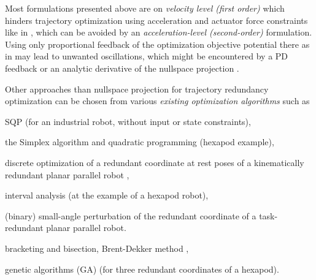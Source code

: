 \documentclass[runningheads]{llncs}
\begin{document}
Most formulations presented above are on \emph{velocity level (first order)} which hinders trajectory optimization using acceleration and actuator force constraints like in \cite{SantosSil2017}, which can be avoided by an \emph{acceleration-level (second-order)} formulation.
Using only proportional feedback of the optimization objective potential there as in \cite{NakamuraHanYos1987,AgarwalNasBan2016} may lead to unwanted oscillations, which might be encountered by a PD feedback \cite{DeLucaOriSic1992,SchapplerOrt2021} or an analytic derivative of the nullspace projection \cite{ReiterMueGat2018}.


Other approaches than nullspace projection for trajectory redundancy optimization can be chosen from various \emph{existing optimization algorithms} such as
\begin{compactitem}
\item SQP \cite{LegerAng2016} (for an industrial robot, without input or state constraints),
\item the Simplex algorithm and quadratic programming \cite{OenWan2007} (hexapod example),
\item discrete optimization of a redundant coordinate at rest poses of a kinematically redundant planar parallel robot \cite{KotlarskiDoHeiOrt2010},
\item interval analysis \cite{MerletPerDan2000} (at the example of a hexapod robot),
\item (binary) small-angle perturbation \cite{GaoCheGaoXia2019} of the redundant coordinate of a task-redundant planar parallel robot.
\item bracketing and bisection, Brent-Dekker method \cite{ZhuQuCaoYan2013},
\item genetic algorithms (GA) \cite{ShawChe2001} (for three redundant coordinates of a hexapod).
\end{compactitem}
\end{document}
